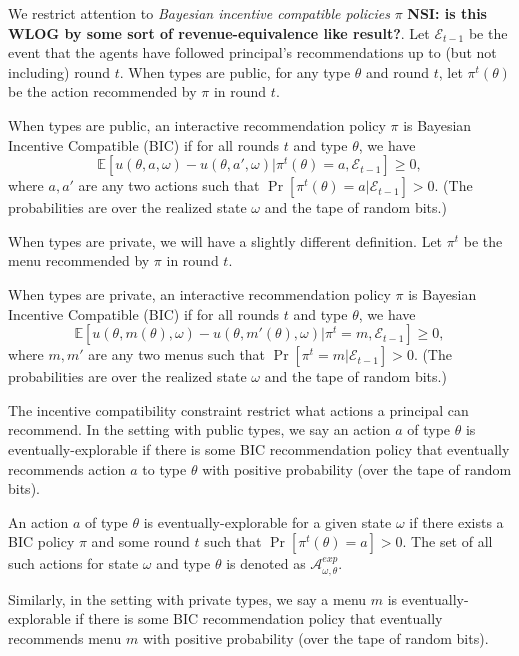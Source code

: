 \documentclass[11pt]{article}
\def\E{\mathbb{E}}
\def\A{\mathcal{A}}
\def\EE{\mathcal{E}}
\begin{document}
We restrict attention to {\em Bayesian incentive compatible policies} $\pi$ {\bf NSI: is this WLOG by some sort of revenue-equivalence like result?}. Let $\EE_{t-1}$ be the event that the agents have followed principal's recommendations up to (but not including) round $t$. When types are public, for any type $\theta$ and round $t$, let $\pi^t(\theta)$ be the action recommended by $\pi$ in round $t$. 

\begin{definition}
When types are public, an interactive recommendation policy $\pi$ is Bayesian Incentive Compatible (BIC) if for all rounds $t$ and type $\theta$, we have
\[
\E[ u(\theta,a,\omega) - u(\theta,a',\omega)| \pi^t(\theta) =a, \EE_{t-1}] \geq 0,
\]
where $a,a'$ are any two actions such that $\Pr[\pi^t(\theta) = a|\EE_{t-1}] > 0$. (The probabilities are over the realized state $\omega$ and the tape of random bits.)
\end{definition}

When types are private, we will have a slightly different definition. Let $\pi^t$ be the menu recommended by $\pi$  in round $t$. 
  
\begin{definition}
When types are private, an interactive recommendation policy $\pi$ is Bayesian Incentive Compatible (BIC) if for all rounds $t$ and type $\theta$, we have
\[
\E[ u(\theta,m(\theta),\omega) - u(\theta,m'(\theta),\omega)| \pi^t = m, \EE_{t-1}] \geq 0,
\]
where $m,m'$ are any two menus such that $\Pr[\pi^t= m|\EE_{t-1}] > 0$. (The probabilities are over the realized state $\omega$ and the tape of random bits.)
\end{definition}

The incentive compatibility constraint restrict what actions a principal can recommend.  In the setting with public types, we say an action $a$ of type $\theta$ is eventually-explorable if there is some BIC recommendation policy that eventually recommends action $a$ to type $\theta$ with positive probability (over the tape of random bits).

\begin{definition}
An action $a$ of type $\theta$ is eventually-explorable for a given state $\omega$ if there exists a BIC policy $\pi$ and some round $t$ such that $\Pr[\pi^t(\theta)=a]>0$.  The set of all such actions for state $\omega$ and type $\theta$ is denoted as $\A_{\omega,\theta}^{exp}$.
\end{definition}

Similarly, in the setting with private types, we say a menu $m$ is eventually-explorable if there is some BIC recommendation policy that eventually recommends menu $m$ with positive probability (over the tape of random bits).
\end{document}
